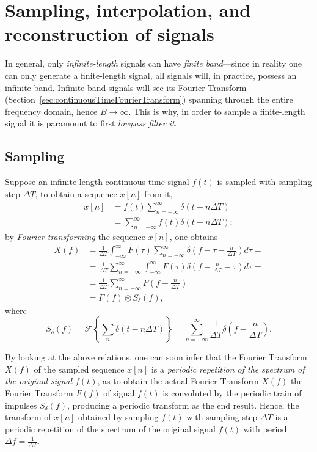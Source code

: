 \documentclass[\documentfontsize, twocolumn]{\classname}
\begin{document}
\chapter{Sampling, interpolation, and reconstruction of signals}

In general, only \emph{infinite-length} signals can have \emph{finite band}---since in reality one can only generate a finite-length signal, all signals will, in practice, possess an infinite band. Infinite band signals will see its Fourier Transform (Section~\ref{sec:continuousTimeFourierTransform}) spanning through the entire frequency domain, hence $B \rightarrow \infty$. This is why, in order to sample a finite-length signal it is paramount to first \emph{lowpass filter it}.

\section{Sampling}

Suppose an infinite-length continuous-time signal $f(t)$ is sampled with sampling step $\Delta T$, to obtain a sequence $x[n]$ from it,
\begin{align*}
    x[n] &= f(t) \sum_{n=-\infty}^\infty \delta(t - n\Delta T)\\
         &= \sum_{n=-\infty}^\infty f(t)\delta(t - n \Delta T);
\end{align*}
by \emph{Fourier transforming} the sequence $x[n]$, one obtains
\begin{align*}
    X(f) &= \frac 1 {\Delta T} \int_{-\infty}^\infty F(\tau) \sum_{n=-\infty}^\infty \delta(f - \tau - \frac n {\Delta T})d\tau = \\
         &= \frac 1 {\Delta T} \sum_{n=-\infty}^\infty \int_{-\infty}^\infty F(\tau)  \delta(f - \frac n {\Delta T} - \tau)d\tau = \\
         &= \frac 1 {\Delta T} \sum_{n=-\infty}^\infty F\left(f - \frac{n}{\Delta T}\right) \\
         &= F(f) \circledast S_\delta (f),
\end{align*}
where
\[
    S_\delta(f) = \mathcal F\left\{\sum_{n} \delta(t - n\Delta T)\right\} = \sum_{n=-\infty}^\infty \frac {1}{\Delta T} \delta(f - \frac n {\Delta T}).
\]

By looking at the above relations, one can soon infer that the Fourier Transform $X(f)$ of the sampled sequence $x[n]$ is a \emph{periodic repetition of the spectrum of the original signal $f(t)$}, as to obtain the actual Fourier Transform $X(f)$ the Fourier Transform $F(f)$ of signal $f(t)$ is convoluted by the periodic train of impulses $S_\delta(f)$, producing a periodic transform as the end result. Hence, the transform of $x[n]$ obtained by sampling $f(t)$ with sampling step $\Delta T$ is a periodic repetition of the spectrum of the original signal $f(t)$ with period $\Delta f = \frac {1}{\Delta T}$.
\end{document}
